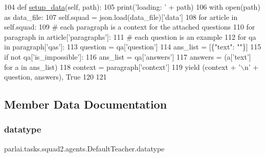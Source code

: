 \begin{DoxyCode}
104     \textcolor{keyword}{def }\hyperlink{namespaceparlai_1_1tasks_1_1multinli_1_1agents_a4fa2cb0ba1ed745336ad8bceed36b841}{setup\_data}(self, path):
105         print(\textcolor{stringliteral}{'loading: '} + path)
106         with open(path) \textcolor{keyword}{as} data\_file:
107             self.squad = json.load(data\_file)[\textcolor{stringliteral}{'data'}]
108         \textcolor{keywordflow}{for} article \textcolor{keywordflow}{in} self.squad:
109             \textcolor{comment}{# each paragraph is a context for the attached questions}
110             \textcolor{keywordflow}{for} paragraph \textcolor{keywordflow}{in} article[\textcolor{stringliteral}{'paragraphs'}]:
111                 \textcolor{comment}{# each question is an example}
112                 \textcolor{keywordflow}{for} qa \textcolor{keywordflow}{in} paragraph[\textcolor{stringliteral}{'qas'}]:
113                     question = qa[\textcolor{stringliteral}{'question'}]
114                     ans\_list = [\{\textcolor{stringliteral}{"text"}: \textcolor{stringliteral}{""}\}]
115                     \textcolor{keywordflow}{if} \textcolor{keywordflow}{not} qa[\textcolor{stringliteral}{'is\_impossible'}]:
116                         ans\_list = qa[\textcolor{stringliteral}{'answers'}]
117                     answers = (a[\textcolor{stringliteral}{'text'}] \textcolor{keywordflow}{for} a \textcolor{keywordflow}{in} ans\_list)
118                     context = paragraph[\textcolor{stringliteral}{'context'}]
119                     \textcolor{keywordflow}{yield} (context + \textcolor{stringliteral}{'\(\backslash\)n'} + question, answers), \textcolor{keyword}{True}
120 
121 
\end{DoxyCode}


\subsection{Member Data Documentation}
\mbox{\label{classparlai_1_1tasks_1_1squad2_1_1agents_1_1DefaultTeacher_a94222f3b61455346a81469cb340906a1}} 
\subsubsection{\texorpdfstring{datatype}{datatype}}
{\footnotesize\ttfamily parlai.\+tasks.\+squad2.\+agents.\+Default\+Teacher.\+datatype}



